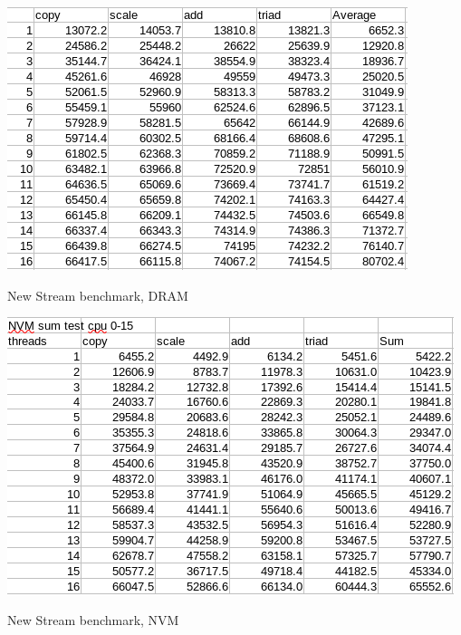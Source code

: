 \documentclass[12pt,a4paper,USenglish]{article}      %
\begin{document}
\begin{table}[!hbtp]
\includegraphics[scale=0.7]{Stream_benchmark.png}
\caption{New Stream benchmark, DRAM}
\end{table}

\begin{table}[!hbtp]
\includegraphics[scale=0.7]{Stream_NVM_sum.png}
\caption{New Stream benchmark, NVM}
\end{table}

\clearpage
\end{document}
